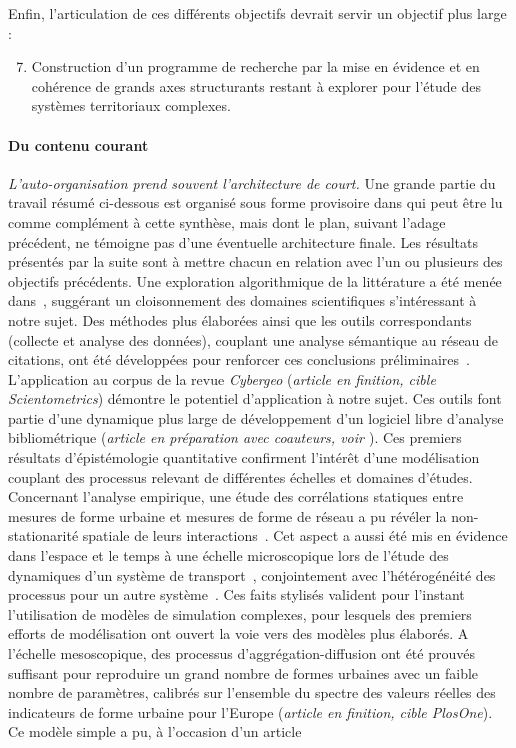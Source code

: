 Enfin, l'articulation de ces différents objectifs devrait servir un objectif plus large :
\begin{enumerate}\setcounter{enumi}{6}
\item Construction d'un programme de recherche par la mise en évidence et en cohérence de grands axes structurants restant à explorer pour l'étude des systèmes territoriaux complexes.
\end{enumerate}








\paragraph{Du contenu courant}

\emph{L'auto-organisation prend souvent l'architecture de court.} Une grande partie du travail résumé ci-dessous est organisé sous forme provisoire dans \cite{raimbault2016memoire} qui peut être lu comme complément à cette synthèse, mais dont le plan, suivant l'adage précédent, ne témoigne pas d'une éventuelle architecture finale. Les résultats présentés par la suite sont à mettre chacun en relation avec l'un ou plusieurs des objectifs précédents. Une exploration algorithmique de la littérature a été menée dans~\cite{raimbault2015models}, suggérant un cloisonnement des domaines scientifiques s'intéressant à notre sujet. Des méthodes plus élaborées ainsi que les outils correspondants (collecte et analyse des données), couplant une analyse sémantique au réseau de citations, ont été développées pour renforcer ces conclusions préliminaires~\cite{raimbault2016indirect}. L'application au corpus de la revue \emph{Cybergeo} (\textit{article en finition, cible Scientometrics}) démontre le potentiel d'application à notre sujet. Ces outils font partie d'une dynamique plus large de développement d'un logiciel libre d'analyse bibliométrique (\textit{article en préparation avec coauteurs, voir \cite{cybergeo20}}). Ces premiers résultats d'épistémologie quantitative confirment l'intérêt d'une modélisation couplant des processus relevant de différentes échelles et domaines d'études. Concernant l'analyse empirique, une étude des corrélations statiques entre mesures de forme urbaine et mesures de forme de réseau a pu révéler la non-stationarité spatiale de leurs interactions~\cite{raimbault2016cautious}. Cet aspect a aussi été mis en évidence dans l'espace et le temps à une échelle microscopique lors de l'étude des dynamiques d'un système de transport~\cite{raimbault2016investigating}, conjointement avec l'hétérogénéité des processus pour un autre système~\cite{raimbault2015hybrid}. Ces faits stylisés valident pour l'instant l'utilisation de modèles de simulation complexes, pour lesquels des premiers efforts de modélisation ont ouvert la voie vers des modèles plus élaborés. A l'échelle mesoscopique, des processus d'aggrégation-diffusion ont été prouvés suffisant pour reproduire un grand nombre de formes urbaines avec un faible nombre de paramètres, calibrés sur l'ensemble du spectre des valeurs réelles des indicateurs de forme urbaine pour l'Europe (\textit{article en finition, cible PlosOne}). Ce modèle simple a pu, à l'occasion d'un article 